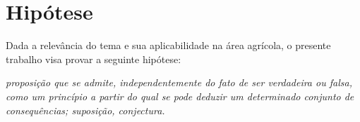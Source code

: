 \iffalse  \fi %

\section*{Hipótese}
    Dada a relevância do tema e sua aplicabilidade na área agrícola, o presente trabalho visa provar a seguinte hipótese:

    \vspace{.8cm}

    \textit{proposição que se admite, independentemente do fato de ser verdadeira ou falsa, como um princípio a partir do qual se pode deduzir um determinado conjunto de consequências; suposição, conjectura.}



